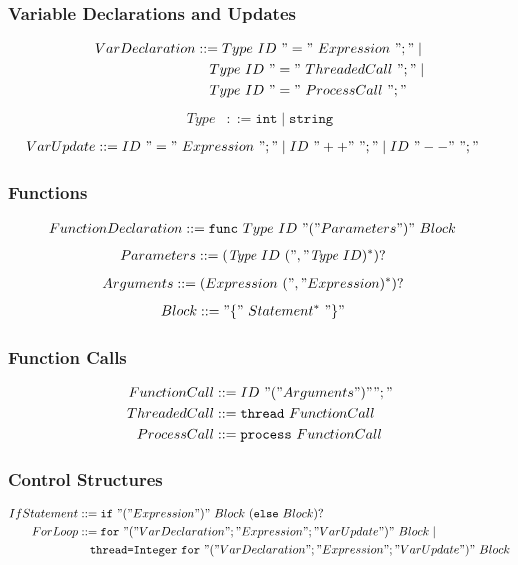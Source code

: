 \subsubsection{Variable Declarations and Updates}
\begin{align*}
VarDeclaration &::= Type\ ID\ "="\ Expression\ ";" \mid \\
&\quad Type\ ID\ "="\ ThreadedCall\ ";" \mid \\
&\quad Type\ ID\ "="\ ProcessCall\ ";"
\end{align*}
\begin{align*}
Type &::= \texttt{int} \mid \texttt{string}
\end{align*}
\begin{align*}
VarUpdate &::= ID\ "="\ Expression\ ";" \mid ID\ "++"\ ";" \mid ID\ "--"\ ";"
\end{align*}
\subsubsection{Functions}
\begin{align*}
FunctionDeclaration &::= \texttt{func}\ Type\ ID\ "(" Parameters ")"\ Block
\end{align*}
\begin{align*}
Parameters &::= (\textit{Type}\ ID\ ("," \textit{Type}\ ID)^*)?
\end{align*}
\begin{align*}
Arguments &::= (Expression\ ("," Expression)^*)?
\end{align*}
\begin{align*}
Block &::= "\{"\ Statement^*\ "\}"
\end{align*}
\subsubsection{Function Calls}
\begin{align*}
FunctionCall &::= ID\ "(" Arguments ")" ";" \\
ThreadedCall &::= \texttt{thread}\ FunctionCall \\
ProcessCall &::= \texttt{process}\ FunctionCall
\end{align*}
\subsubsection{Control Structures}
\begin{align*}
IfStatement &::= \texttt{if}\ "(" Expression ")"\ Block\ (\texttt{else}\ Block)? \\
ForLoop &::= \texttt{for}\ "(" VarDeclaration ";" Expression ";" VarUpdate ")"\ Block \mid \\
&\quad \texttt{thread=Integer}\ \texttt{for}\ "(" VarDeclaration ";" Expression ";" VarUpdate ")"\ Block
\end{align*}
